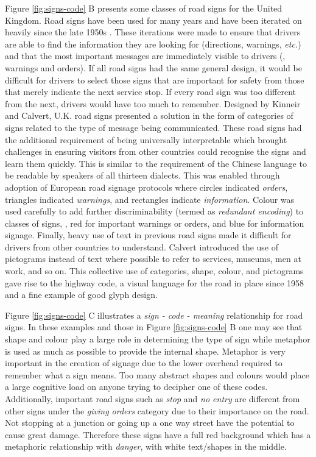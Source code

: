 Figure \ref{fig:signs-code} B presents some classes of road signs for the United Kingdom. 
Road signs have been used for many years and have been iterated on heavily since the late 1950s \cite{kinneir1980words}. 
These iterations were made to ensure that drivers are able to find the information they are looking for (directions, warnings, \emph{etc.}) and that the most important messages are immediately visible to drivers (\eg, warnings and orders). 
If all road signs had the same general design, it would be difficult for drivers to select those signs that are important for safety from those that merely indicate the next service stop. 
If every road sign was too different from the next, drivers would have too much to remember. 
Designed by Kinneir and Calvert, U.K. road signs presented a solution in the form of categories of signs related to the type of message being communicated. 
These road signs had the additional requirement of being universally interpretable which brought challenges in ensuring visitors from other countries could recognise the signs and learn them quickly. 
This is similar to the requirement of the Chinese language to be readable by speakers of all thirteen dialects. 
This was enabled through adoption of European road signage protocols where circles indicated \emph{orders}, triangles indicated \emph{warnings}, and rectangles indicate \emph{information}. 
Colour was used carefully to add further discriminability (termed as \emph{redundant encoding}) to classes of signs, \eg, red for important warnings or orders, and blue for information signage. 
Finally, heavy use of text in previous road signs made it difficult for drivers from other countries to understand. 
Calvert introduced the use of pictograms instead of text where possible to refer to services, museums, men at work, and so on. 
This collective use of categories, shape, colour, and pictograms gave rise to the highway code, a visual language for the road in place since 1958 and a fine example of good glyph design.

Figure \ref{fig:signs-code} C illustrates a \emph{sign - code - meaning} relationship for road signs. 
In these examples and those in Figure \ref{fig:signs-code} B one may see that shape and colour play a large role in determining the type of sign while metaphor is used as much as possible to provide the internal shape. 
Metaphor is very important in the creation of signage due to the lower overhead required to remember what a sign means. 
Too many abstract shapes and colours would place a large cognitive load on anyone trying to decipher one of these codes. 
Additionally, important road signs such as \emph{stop} and \emph{no entry} are different from other signs under the \emph{giving orders} category due to their importance on the road. 
Not stopping at a junction or going up a one way street have the potential to cause great damage. 
Therefore these signs have a full red background which has a metaphoric relationship with \emph{danger}, with white text/shapes in the middle. 

